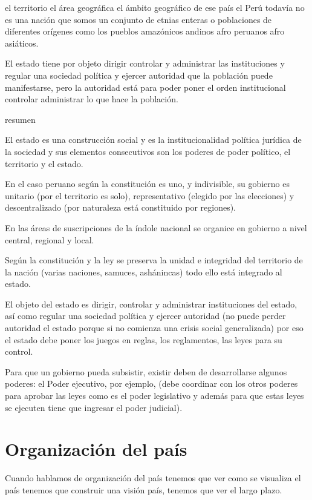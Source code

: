\documentclass[
  a4paper,
]{article}
\begin{document}
el territorio el área geográfica el ámbito geográfico de ese país el
Perú todavía no es una nación que somos un conjunto de etnias enteras o
poblaciones de diferentes orígenes como los pueblos amazónicos andinos
afro peruanos afro asiáticos.

El estado tiene por objeto dirigir controlar y administrar las
instituciones y regular una sociedad política y ejercer autoridad que la
población puede manifestarse, pero la autoridad está para poder poner el
orden institucional controlar administrar lo que hace la población.

resumen

El estado es una construcción social y es la institucionalidad política
jurídica de la sociedad y sus elementos consecutivos son los poderes de
poder político, el territorio y el estado.

En el caso peruano según la constitución es uno, y indivisible, su
gobierno es unitario (por el territorio es solo), representativo
(elegido por las elecciones) y descentralizado (por naturaleza está
constituido por regiones).

En las áreas de suscripciones de la índole nacional se organice en
gobierno a nivel central, regional y local.

Según la constitución y la ley se preserva la unidad e integridad del
territorio de la nación (varias naciones, samuces, ashánincas) todo ello
está integrado al estado.

El objeto del estado es dirigir, controlar y administrar instituciones
del estado, así como regular una sociedad política y ejercer autoridad
(no puede perder autoridad el estado porque si no comienza una crisis
social generalizada) por eso el estado debe poner los juegos en reglas,
los reglamentos, las leyes para su control.

Para que un gobierno pueda subsistir, existir deben de desarrollarse
algunos poderes: el Poder ejecutivo, por ejemplo, (debe coordinar con
los otros poderes para aprobar las leyes como es el poder legislativo y
además para que estas leyes se ejecuten tiene que ingresar el poder
judicial).

\section{Organización del país}\label{organizaciuxf3n-del-pauxeds}

Cuando hablamos de organización del país tenemos que ver como se
visualiza el país tenemos que construir una visión país, tenemos que ver
el largo plazo.
\end{document}
